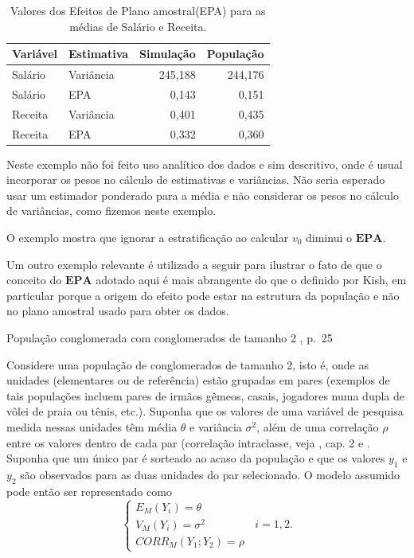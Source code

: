 \documentclass[]{book}
\theoremstyle{definition}
\theoremstyle{definition}
\theoremstyle{definition}
\theoremstyle{remark}
\let\BeginKnitrBlock\begin \let\EndKnitrBlock\end
\begin{document}
\begin{table}

\caption{\label{tab:eparec}Valores dos Efeitos de Plano amostral(EPA) para as médias de Salário e Receita.}
\centering
\begin{tabular}[t]{llrr}
\toprule
Variável & Estimativa & Simulação & População\\
\midrule
Salário & Variância & 245,188 & 244,176\\
Salário & EPA & 0,143 & 0,151\\
Receita & Variância & 0,401 & 0,435\\
Receita & EPA & 0,332 & 0,360\\
\bottomrule
\end{tabular}
\end{table}

\BeginKnitrBlock{remark}
{}Neste exemplo não foi feito uso analítico
dos dados e sim descritivo, onde é usual incorporar os pesos no cálculo
de estimativas e variâncias. Não seria esperado usar um estimador
ponderado para a média e não considerar os pesos no cálculo de
variâncias, como fizemos neste exemplo.
\EndKnitrBlock{remark}

\BeginKnitrBlock{remark}
{}O exemplo mostra que ignorar a
estratificação ao calcular \(v_{0}\) diminui o \(\mathbf{EPA}\).
\EndKnitrBlock{remark}

Um outro exemplo relevante é utilizado a seguir para ilustrar o fato de
que o conceito do \(\mathbf{EPA}\) adotado aqui é mais abrangente do que
o definido por Kish, em particular porque a origem do efeito pode estar
na estrutura da população e não no plano amostral usado para obter os
dados.

\BeginKnitrBlock{example}
\protect\hypertarget{exm:exe43}{}{\label{exm:exe43} }População conglomerada
com conglomerados de tamanho 2 \citep{SHS89}, p.~25
\EndKnitrBlock{example}

Considere uma população de conglomerados de tamanho 2, isto é, onde as
unidades (elementares ou de referência) estão grupadas em pares
(exemplos de tais populações incluem pares de irmãos gêmeos, casais,
jogadores numa dupla de vôlei de praia ou tênis, etc.). Suponha que os
valores de uma variável de pesquisa medida nessas unidades têm média
\(\theta\) e variância \(\sigma ^{2}\), além de uma correlação \(\rho\)
entre os valores dentro de cada par (correlação intraclasse, veja
\citep{SilvaMou}, cap. 2 e \citep{haggard}. Suponha que um único par é
sorteado ao acaso da população e que os valores \(y_{1}\) e \(y_{2}\)
são observados para as duas unidades do par selecionado. O modelo
assumido pode então ser representado como \[
\left\{ 
\begin{array}{l}
E_{M}\left( Y_{i}\right) =\theta \\ 
V_{M}\left( Y_{i}\right) =\sigma ^{2} \\ 
CORR_{M}\left( Y_{1};Y_{2}\right) =\rho
\end{array}
\right. \;\;i=1,2. 
\]
\end{document}

